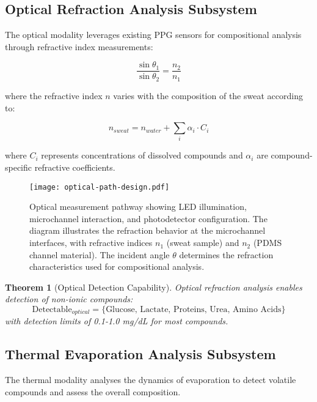 \documentclass[12pt,a4paper]{article}
\newtheorem{theorem}{Theorem}[section]
\begin{document}
\subsection{Optical Refraction Analysis Subsystem}

The optical modality leverages existing PPG sensors for compositional analysis through refractive index measurements:

\begin{equation}
\frac{\sin \theta_1}{\sin \theta_2} = \frac{n_2}{n_1}
\end{equation}

where the refractive index $n$ varies with the composition of the sweat according to:

\begin{equation}
n_{sweat} = n_{water} + \sum_{i} \alpha_i \cdot C_i
\end{equation}

where $C_i$ represents concentrations of dissolved compounds and $\alpha_i$ are compound-specific refractive coefficients.

\begin{figure}[htbp]
\centering
\texttt{[image: optical-path-design.pdf]}
\caption{Optical measurement pathway showing LED illumination, microchannel interaction, and photodetector configuration. The diagram illustrates the refraction behavior at the microchannel interfaces, with refractive indices \(n_1\) (sweat sample) and \(n_2\) (PDMS channel material). The incident angle \(\theta\) determines the refraction characteristics used for compositional analysis.}
\label{fig:optical-path-design}
\end{figure}

\begin{theorem}[Optical Detection Capability]
Optical refraction analysis enables detection of non-ionic compounds:
\begin{equation}
\text{Detectable}_{optical} = \{\text{Glucose, Lactate, Proteins, Urea, Amino Acids}\}
\end{equation}
with detection limits of 0.1-1.0 mg/dL for most compounds.
\end{theorem}

\subsection{Thermal Evaporation Analysis Subsystem}

The thermal modality analyses the dynamics of evaporation to detect volatile compounds and assess the overall composition.
\end{document}
